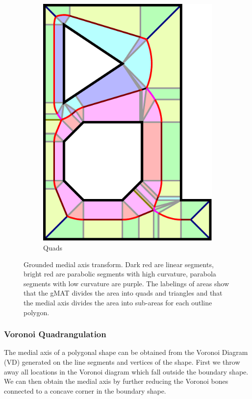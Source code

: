 \begin{figure}
\begin{subfigure}{0.24\columnwidth}
\includegraphics[width=\columnwidth]{sources/method/gMAT_example_labeling.pdf}
\caption{Quads}
\end{subfigure}
\caption{Grounded medial axis transform. Dark red are linear segments,  bright red are parabolic segments with high curvature, parabola segments with low curvature are purple. The labelings of areas show that the gMAT divides the area into quads and triangles and that the medial axis divides the area into sub-areas for each outline polygon.}
\label{gmat}
\end{figure}



\subsubsection{Voronoi Quadrangulation}
The medial axis of a polygonal shape can be obtained from the Voronoi Diagram (VD) generated on the line segments and vertices of the shape. \cite{lee1982medial}
First we throw away all locations in the Voronoi diagram which fall outside the boundary shape.
We can then obtain the medial axis by further reducing the Voronoi bones connected to a concave corner in the boundary shape.

